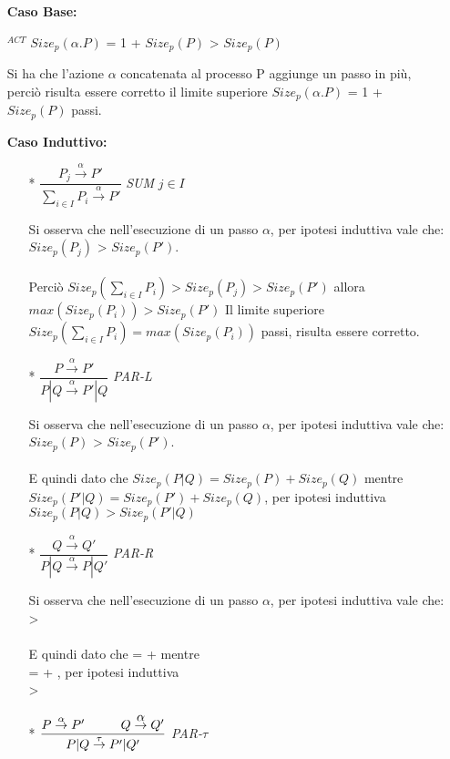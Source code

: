 \begin{itemize}
	\item[] \textbf{Caso Base:} \mbox{}
	
	
	$^{ACT}$ \hspace{1cm} $Size_{p}(\alpha.P)$ = 1 + $Size_{p}(P)$ > $Size_{p}(P)$
	
	Si ha che l'azione $\alpha$ concatenata al processo P aggiunge un passo in più, perciò risulta essere corretto il limite superiore $Size_{p}(\alpha.P)$ = 1 + $Size_{p}(P)$ passi.
	\\
	\item[] \textbf{Caso Induttivo:} \mbox{}
	\\
	\begin{itemize}
		
		\item[*]
			$\dfrac{P_{j} \overset{\alpha}\rightarrow P'}{\displaystyle\sum_{i\in I}^{}P_{i} \overset{\alpha}\rightarrow P'}$ \textit{SUM} $j\in I$                         
		
		Si osserva che nell'esecuzione di un passo $\alpha$, per ipotesi induttiva vale che: $Size_{p}(P_{j})$ > $Size_{p}(P')$. \\
		\\
		Perciò $Size_{p}(\displaystyle\sum_{i\in I}^{}P_{i}) > Size_{p}(P_{j}) > Size_{p}(P') $ allora $ max(Size_{p}(P_{i})) > Size_{p}(P')$
		Il limite superiore  $ Size_{p}(\displaystyle\sum_{i\in I}^{}P_{i}) = max(Size_{p}(P_{i}))$ passi, risulta essere corretto.
		\\
		\item[*]
				$\dfrac{P \overset{\alpha}\rightarrow P'}{P|Q \overset{\alpha}\rightarrow P'|Q}$ \textit{PAR-L}  
				
				Si osserva che nell'esecuzione di un passo $\alpha$, per ipotesi induttiva vale che: $Size_{p}(P)$ > $Size_{p}(P')$. \\
				\\
				E quindi dato che $Size_{p}(P|Q) = Size_{p}(P) + Size_{p}(Q)$ mentre $  Size_{p}(P'|Q) = Size_{p}(P') + Size_{p}(Q)$, per ipotesi induttiva $Size_{p}(P|Q) > Size_{p}(P'|Q) $
				\\
		\item[*]
			$\dfrac{Q \overset{\alpha}\rightarrow Q'}{P|Q \overset{\alpha}\rightarrow P|Q'}$ \textit{PAR-R}  
			
			Si osserva che nell'esecuzione di un passo $\alpha$, per ipotesi induttiva vale che:  >  \\
			\\
			E quindi dato che  =  +  mentre\\  =  + , per ipotesi induttiva \\  > 
			\\
		\item[*]
			$\dfrac{P \overset{\alpha}\rightarrow P' \hspace{1cm} Q \overset{\Overline[0.01pt]{\alpha}}\rightarrow Q'}{P|Q \overset{\tau}\rightarrow P'|Q'}$ \textit{PAR-$\tau$}  
			

\end{itemize}
\end{itemize}
